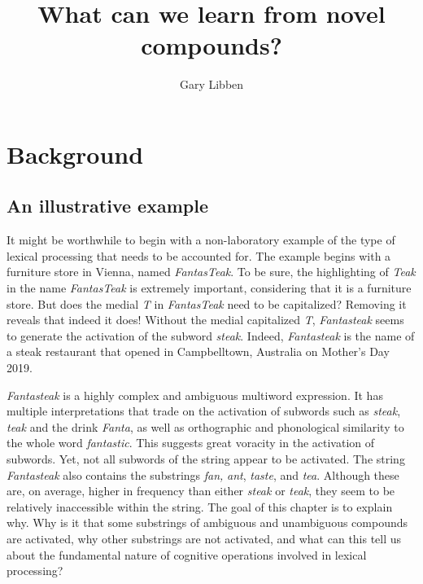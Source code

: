 \documentclass[output=paper]{langsci/langscibook}
\title{What can we learn from novel compounds?}
\author{Gary Libben\affiliation{Brock University}}
\begin{document}
\maketitle

\section{Background}\label{sec:libben:1}\largerpage
\subsection{An illustrative example}\label{sec:libben:1.1}
It might be worthwhile to begin with a non-laboratory example of the type of lexical processing that needs to be accounted for.   The example begins with a furniture store in Vienna, named \textit{FantasTeak}.  To be sure, the highlighting of \textit{Teak} in the name \textit{FantasTeak} is extremely important, considering that it is a furniture store. But does the medial \textit{T} in \textit{FantasTeak} need to be capitalized?  Removing it reveals that indeed it does!  Without the medial capitalized \textit{T}, \textit{Fantasteak} seems to generate the activation of the subword \textit{steak}. Indeed, \textit{Fantasteak} is the name of a steak restaurant that opened in Campbelltown, Australia on Mother’s Day 2019. 

\textit{Fantasteak} is a highly complex and ambiguous multiword expression. It has multiple interpretations that trade on the activation of subwords such as \textit{steak}, \textit{teak} and the drink \textit{Fanta}, as well as orthographic and phonological similarity to the whole word \textit{fantastic}.  This suggests great voracity in the activation of subwords. Yet, not all subwords of the string appear to be activated. The string \textit{Fantasteak} also contains the substrings \textit{fan,} \textit{ant}, \textit{taste}, and \textit{tea}.  Although these are, on average, higher in frequency than either \textit{steak} or \textit{teak}, they seem to be relatively inaccessible within the string. The goal of this chapter is to explain why.  Why is it that some substrings of ambiguous and unambiguous compounds are activated, why other substrings are not activated, and what can this tell us about the fundamental nature of cognitive operations involved in lexical processing?
\end{document}
